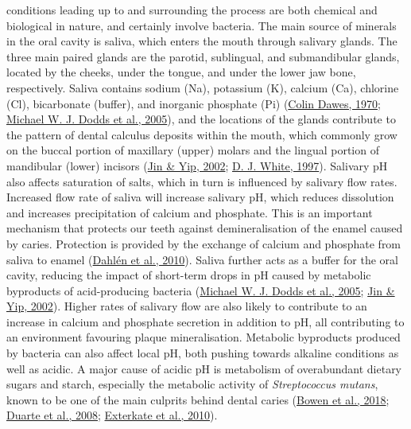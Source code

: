 \documentclass[
  letterpaper,
]{book}
\begin{document}
conditions leading up to and surrounding the process are both chemical
and biological in nature, and certainly involve bacteria. The main
source of minerals in the oral cavity is saliva, which enters the mouth
through salivary glands. The three main paired glands are the parotid,
sublingual, and submandibular glands, located by the cheeks, under the
tongue, and under the lower jaw bone, respectively. Saliva contains
sodium (Na), potassium (K), calcium (Ca), chlorine (Cl), bicarbonate
(buffer), and inorganic phosphate (Pi)
(\protect\hyperlink{ref-dawesEffectsDiet1970}{Colin Dawes, 1970};
\protect\hyperlink{ref-doddsHealthBenefits2005}{Michael W. J. Dodds et
al., 2005}), and the locations of the glands contribute to the pattern
of dental calculus deposits within the mouth, which commonly grow on the
buccal portion of maxillary (upper) molars and the lingual portion of
mandibular (lower) incisors
(\protect\hyperlink{ref-jinSupragingivalCalculus2002}{Jin \& Yip, 2002};
\protect\hyperlink{ref-whiteDentalCalculus1997}{D. J. White, 1997}).
Salivary pH also affects saturation of salts, which in turn is
influenced by salivary flow rates. Increased flow rate of saliva will
increase salivary pH, which reduces dissolution and increases
precipitation of calcium and phosphate. This is an important mechanism
that protects our teeth against demineralisation of the enamel caused by
caries. Protection is provided by the exchange of calcium and phosphate
from saliva to enamel
(\protect\hyperlink{ref-dahlenMicrobiologicalStudy2010}{Dahlén et al.,
2010}). Saliva further acts as a buffer for the oral cavity, reducing
the impact of short-term drops in pH caused by metabolic byproducts of
acid-producing bacteria
(\protect\hyperlink{ref-doddsHealthBenefits2005}{Michael W. J. Dodds et
al., 2005}; \protect\hyperlink{ref-jinSupragingivalCalculus2002}{Jin \&
Yip, 2002}). Higher rates of salivary flow are also likely to contribute
to an increase in calcium and phosphate secretion in addition to pH, all
contributing to an environment favouring plaque mineralisation.
Metabolic byproducts produced by bacteria can also affect local pH, both
pushing towards alkaline conditions as well as acidic. A major cause of
acidic pH is metabolism of overabundant dietary sugars and starch,
especially the metabolic activity of \emph{Streptococcus mutans}, known
to be one of the main culprits behind dental caries
(\protect\hyperlink{ref-bowenOralBiofilms2018}{Bowen et al., 2018};
\protect\hyperlink{ref-duarteInfluencesStarch2008}{Duarte et al., 2008};
\protect\hyperlink{ref-extercateAAA2010}{Exterkate et al., 2010}).
\end{document}
